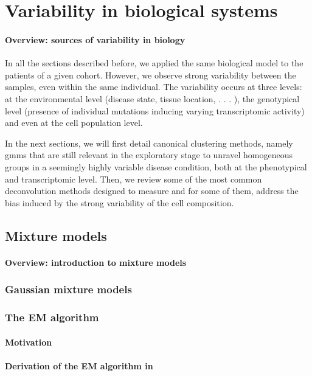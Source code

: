 \section{Variability in biological systems}

\paragraph{Overview: sources of variability in biology}

In all the sections described before, we applied the same biological model to the patients of a given cohort. However, we observe strong variability between the samples, even within the same individual. The variability occurs at three levels: at the environmental level (disease state, tissue location, . . . ), the genotypical level (presence of individual mutations inducing varying transcriptomic activity) and even at the cell population level. 

In the next sections, we will first detail canonical clustering methods, namely \Glspl{gmm} that are still relevant in the exploratory stage to unravel homogeneous groups in a seemingly highly variable disease condition, both at the phenotypical and transcriptomic level. Then, we review some of the most common deconvolution methods designed to measure and for some of them, address the bias induced by the strong variability of the cell composition.



\subsection{Mixture models} 
\paragraph{Overview: introduction to mixture models}

\subsubsection{Gaussian mixture models}

\subsubsection{The EM algorithm}
\paragraph{Motivation}
\paragraph{Derivation of the EM algorithm in }

